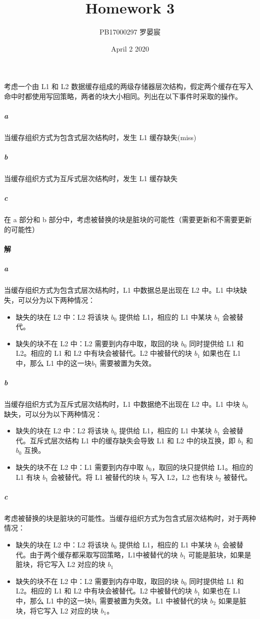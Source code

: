 \documentclass{article}
\title{Homework 3}
\author{PB17000297 罗晏宸}
\date{April 2 2020}
\begin{document}
\maketitle

\section{}
考虑一个由 L1 和 L2 数据缓存组成的两级存储器层次结构，假定两个缓存在写入命中时都使用写回策略，两者的块大小相同。列出在以下事件时采取的操作。
\subparagraph{a} 当缓存组织方式为包含式层次结构时，发生 L1 缓存缺失(miss)
\subparagraph{b} 当缓存组织方式为互斥式层次结构时，发生 L1 缓存缺失
\subparagraph{c} 在 a 部分和 b 部分中，考虑被替换的块是脏块的可能性（需要更新和不需要更新的可能性）

\paragraph{解}
\subparagraph{a}
当缓存组织方式为包含式层次结构时，L1 中数据总是出现在 L2 中。L1 中块缺失，可以分为以下两种情况：
\begin{itemize}
    \item 缺失的块在 L2 中：L2 将该块 $b_0$ 提供给 L1，相应的 L1 中某块 $b_1$ 会被替代。
    \item 缺失的块不在 L2 中：L2 需要到内存中取，取回的块 $b_0$ 同时提供给 L1 和 L2。相应的 L1 和 L2 中有块会被替代。L2 中被替代的块 $b_1$ 如果也在 L1 中，那么 L1 中的这一块$b_1$ 需要被置为失效。
\end{itemize}

\subparagraph{b}
当缓存组织方式为互斥式层次结构时，L1 中数据绝不出现在 L2 中。L1 中块 $b_0$ 缺失，可以分为以下两种情况：
\begin{itemize}
    \item 缺失的块在 L2 中：L2 将该块 $b_0$ 提供给 L1，相应的 L1 中某块 $b_1$ 会被替代。互斥式层次结构 L1 中的缓存缺失会导致 L1 和 L2 中的块互换，即 $b_1$ 和 $b_0$ 互换。
    \item 缺失的块不在 L2 中：L1 需要到内存中取 $b_0$，取回的块只提供给 L1。相应的 L1 有块 $b_1$ 会被替代。将 L1 被替代的块 $b_1$ 写入 L2，L2 也有块 $b_2$ 被替代。
\end{itemize}

\subparagraph{c}
考虑被替换的块是脏块的可能性。当缓存组织方式为包含式层次结构时，对于两种情况：
\begin{itemize}
    \item 缺失的块在 L2 中：L2 将该块 $b_0$ 提供给 L1，相应的 L1 中某块 $b_1$ 会被替代。由于两个缓存都采取写回策略，L1中被替代的块 $b_1$ 可能是脏块，如果是脏块，将它写入 L2 对应的块 $b_1$
    \item 缺失的块不在 L2 中：L2 需要到内存中取，取回的块 $b_0$ 同时提供给 L1 和 L2。相应的 L1 和 L2 中有块会被替代。L2 中被替代的块 $b_1$ 如果也在 L1 中，那么 L1 中的这一块$b_1$ 需要被置为失效。L1 中被替代的块 $b_2$ 如果是脏块，将它写入 L2 对应的块 $b_1$。
\end{itemize}
\end{document}
